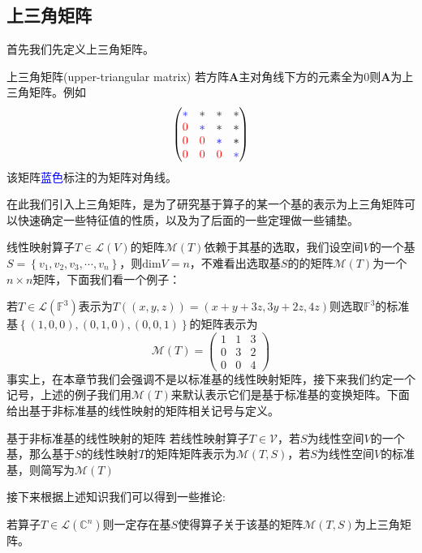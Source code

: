 \subsection{上三角矩阵}

首先我们先定义上三角矩阵。

\begin{definition}{上三角矩阵(upper-triangular matrix)}
	若方阵$\mathbf{A}$主对角线下方的元素全为0则$\mathbf{A}$为上三角矩阵。例如$$\begin{pmatrix}
 \textcolor{blue}{*}  & * & * & *\\
 \textcolor{red}{0}  & \textcolor{blue}{*} & * & *\\
 \textcolor{red}{0} & \textcolor{red}{0} & \textcolor{blue}{*} & *\\
 \textcolor{red}{0} & \textcolor{red}{0} & \textcolor{red}{0} & \textcolor{blue}{*}
\end{pmatrix}$$该矩阵\textcolor{blue}{蓝色}标注的为矩阵对角线。
\end{definition}

在此我们引入上三角矩阵，是为了研究基于算子的某一个基的表示为上三角矩阵可以快速确定一些特征值的性质，以及为了后面的一些定理做一些铺垫。

线性映射算子$T\in\mathcal{L}(V)$的矩阵$\mathcal{M}(T)$依赖于其基的选取，我们设空间$V$的一个基$S=\left\{ v_1,v_2,v_3,\cdots,v_n \right\}$，则$\text{dim}V=n$，不难看出选取基$S$的的矩阵$\mathcal{M}(T)$为一个$n\times n$矩阵，下面我们看一个例子：

若$T\in \mathcal{L}(\mathbb{F}^3)$表示为$T((x,y,z))=(x+y+3z,3y+2z,4z)$则选取$\mathbb{F}^3$的标准基$\left\{ (1,0,0),(0,1,0),(0,0,1) \right\}$的矩阵表示为$$\mathcal{M}(T)=\begin{pmatrix}
 1 & 1 & 3\\
 0 & 3 & 2\\
 0 & 0 & 4
\end{pmatrix}$$事实上，在本章节我们会强调不是以标准基的线性映射矩阵，接下来我们约定一个记号，上述的例子我们用$\mathcal{M}(T)$来默认表示它们是基于标准基的变换矩阵。下面给出基于非标准基的线性映射的矩阵相关记号与定义。
\begin{definition}{基于非标准基的线性映射的矩阵}
	若线性映射算子$T\in\mathcal{V}$，若$S$为线性空间$V$的一个基，那么基于$S$的线性映射$T$的矩阵矩阵表示为$\mathcal{M}(T,S)$，若$S$为线性空间$V$的标准基，则简写为$\mathcal{M}(T)$
\end{definition}

接下来根据上述知识我们可以得到一些推论:

\begin{corollary}
	\label{cor:tri}
	若算子$T\in\mathcal{L}(\mathbb{C}^n)$则一定存在基$S$使得算子关于该基的矩阵$\mathcal{M}(T,S)$为上三角矩阵。
\end{corollary}

